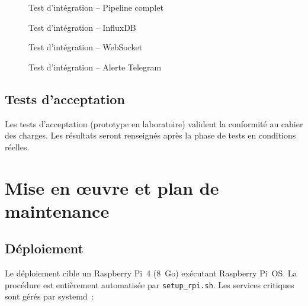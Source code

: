 \begin{figure}[htbp]
  \centering
  \caption{Test d'intégration -- Pipeline complet}
  \label{fig:test_pipeline}
\end{figure}

\begin{figure}[htbp]
  \centering
  \caption{Test d'intégration -- InfluxDB}
  \label{fig:test_influxdb}
\end{figure}

\begin{figure}[htbp]
  \centering
  \caption{Test d'intégration -- WebSocket}
  \label{fig:test_websocket}
\end{figure}

\begin{figure}[htbp]
  \centering
  \caption{Test d'intégration -- Alerte Telegram}
  \label{fig:test_telegram}
\end{figure}

\subsection{Tests d'acceptation}

Les tests d'acceptation (prototype en laboratoire) valident la conformité au cahier des charges. Les résultats seront renseignés après la phase de tests en conditions réelles.

\section{Mise en œuvre et plan de maintenance}

\subsection{Déploiement}

Le déploiement cible un Raspberry Pi~4 (8~Go) exécutant Raspberry Pi~OS. La procédure est entièrement automatisée par \texttt{setup\_rpi.sh}. Les services critiques sont gérés par systemd~:

